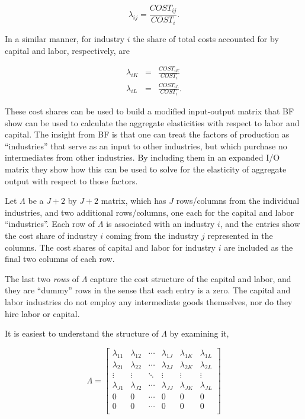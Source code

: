 \documentclass[11pt]{article}
\begin{document}
\begin{equation}
	\lambda_{ij} = \frac{COST_{ij}}{COST_i}. \label{EQ_lambdaij}
\end{equation}

In a similar manner, for industry $i$ the share of total costs accounted for by capital and labor, respectively, are

\begin{eqnarray}
	\lambda_{iK} &=& \frac{COST_{iK}}{COST_i} \\
	\lambda_{iL} &=& \frac{COST_{iL}}{COST_i}.
\end{eqnarray}

These cost shares can be used to build a modified input-output matrix that BF show can be used to calculate the aggregate elasticities with respect to labor and capital. The insight from BF is that one can treat the factors of production as ``industries'' that serve as an input to other industries, but which purchase no intermediates from other industries. By including them in an expanded I/O matrix they show how this can be used to solve for the elasticity of aggregate output with respect to those factors. 

Let $\Lambda$ be a $J+2$ by $J+2$ matrix, which has $J$ rows/columns from the individual industries, and two additional rows/columns, one each for the capital and labor ``industries''. Each row of $\Lambda$ is associated with an industry $i$, and the entries show the cost share of industry $i$ coming from the industry $j$ represented in the columns. The cost shares of capital and labor for industry $i$ are included as the final two columns of each row. 

The last two \textit{rows} of $\Lambda$ capture the cost structure of the capital and labor, and they are ``dummy'' rows in the sense that each entry is a zero. The capital and labor industries do not employ any intermediate goods themselves, nor do they hire labor or capital.

It is easiest to understand the structure of $\Lambda$ by examining it,

\begin{equation}
	\Lambda = 
	\begin{bmatrix}
		\lambda_{11} & \lambda_{12} & \cdots & \lambda_{1J} & \lambda_{1K} & \lambda_{1L} \\
		\lambda_{21} & \lambda_{22} & \cdots & \lambda_{2J} & \lambda_{2K} & \lambda_{2L} \\
		\vdots       & \vdots       & \ddots & \vdots       & \vdots       & \vdots  \\
		\lambda_{J1} & \lambda_{J2} & \cdots & \lambda_{JJ} & \lambda_{JK} & \lambda_{JL} \\
		0 & 0 & \cdots & 0 & 0& 0 \\
		0 & 0 & \cdots & 0 & 0& 0 \\
	\end{bmatrix} \label{EQ_Lambda}
\end{equation} 
\end{document}

